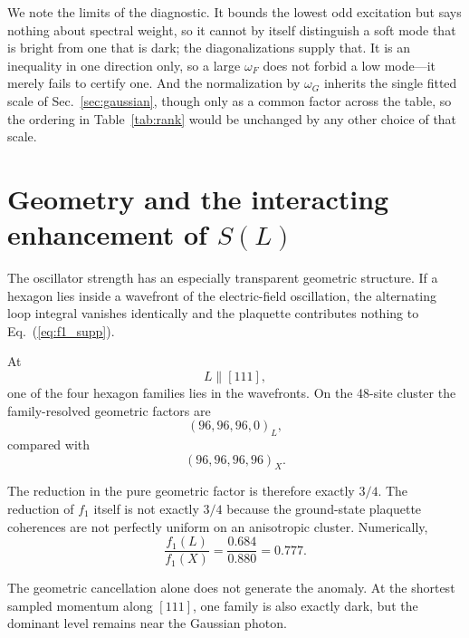 \documentclass[
aps,
prl,
onecolumn,
amsmath,
amssymb,
superscriptaddress,
longbibliography
]{revtex4-2}
\begin{document}
We note the limits of the diagnostic. It bounds the lowest odd
excitation but says nothing about spectral weight, so it cannot by
itself distinguish a soft mode that is bright from one that is dark;
the diagonalizations supply that. It is an inequality in one direction
only, so a large $\omega_F$ does not forbid a low mode---it merely
fails to certify one. And the normalization by $\omega_G$ inherits the
single fitted scale of Sec.~\ref{sec:gaussian}, though only as a
common factor across the table, so the ordering in
Table~\ref{tab:rank} would be unchanged by any other choice of that
scale.

\section{Geometry and the interacting enhancement of $S(L)$}
\label{sec:geometry}

The oscillator strength has an especially transparent geometric
structure.
If a hexagon lies inside a wavefront of the electric-field
oscillation, the alternating loop integral vanishes identically and
the plaquette contributes nothing to Eq.~(\ref{eq:f1_supp}).

At
\begin{equation}
L\parallel[111],
\end{equation}
one of the four hexagon families lies in the wavefronts.
On the 48-site cluster the family-resolved geometric factors are
\begin{equation}
(96,96,96,0)_L,
\end{equation}
compared with
\begin{equation}
(96,96,96,96)_X .
\end{equation}

The reduction in the pure geometric factor is therefore exactly
$3/4$.
The reduction of $f_1$ itself is not exactly $3/4$ because the
ground-state plaquette coherences are not perfectly uniform on an
anisotropic cluster.
Numerically,
\begin{equation}
\frac{f_1(L)}{f_1(X)}
=
\frac{0.684}{0.880}
=
0.777.
\end{equation}

The geometric cancellation alone does not generate the anomaly.
At the shortest sampled momentum along $[111]$, one family is also
exactly dark, but the dominant level remains near the Gaussian
photon.
\end{document}
